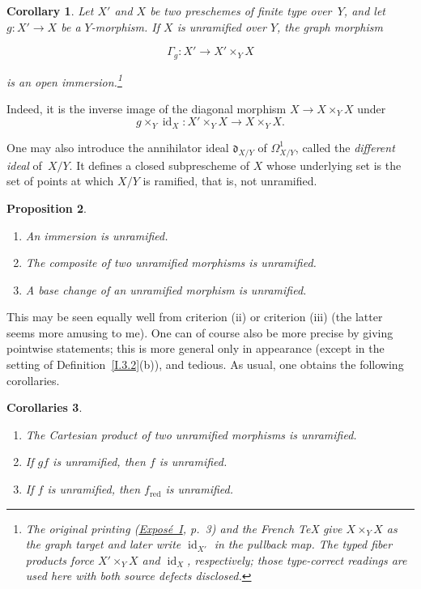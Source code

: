\documentclass[11pt,oneside]{amsbook}
\newtheorem{proposition}{Proposition}[section]
\newtheorem{corollary}[proposition]{Corollary}
\newtheorem{corollaries}[proposition]{Corollaries}
\theoremstyle{remark}
\theoremstyle{plain}
\numberwithin{equation}{section}
\begin{document}
\begin{corollary}
\label{I.3.4}
Let \(X'\) and \(X\) be two preschemes of finite type over~\(Y\), and let
\(g\colon X'\to X\) be a \(Y\)-morphism.  If \(X\) is unramified over
\(Y\), the graph morphism

\[
  \Gamma_g\colon X'\longrightarrow X'\times_Y X
\]

is an open immersion.\footnote{The original printing
(\hyperref[I]{Expos\'e~I}, p.~3) and
the French TeX give \(X\times_Y X\) as the graph target and later write
\(\operatorname{id}_{X'}\) in the pullback map.  The typed fiber products
force \(X'\times_Y X\) and \(\operatorname{id}_X\), respectively; those
type-correct readings are used here with both source defects disclosed.}
\end{corollary}

Indeed, it is the inverse image of the diagonal morphism
\(X\to X\times_Y X\) under
\[
g\times_Y\operatorname{id}_{X}\colon
X'\times_Y X\longrightarrow X\times_Y X.
\]

One may also introduce the annihilator ideal
\(\mathfrak d_{X/Y}\)\label{indnot:af} of \(\Omega^1_{X/Y}\), called the
\emph{different ideal} of~\(X/Y\).  It defines a closed subprescheme of
\(X\) whose underlying set is the set of points at which \(X/Y\) is
ramified, that is, not unramified.

\begin{proposition}
\label{I.3.5}
\begin{enumerate}
\item[(i)] An immersion is unramified.
\item[(ii)] The composite of two unramified morphisms is unramified.
\item[(iii)] A base change of an unramified morphism is unramified.
\end{enumerate}
\end{proposition}

This may be seen equally well from criterion \textup{(ii)} or criterion
\textup{(iii)} (the latter seems more amusing to me).  One can of course
also be more precise by giving pointwise statements; this is more general
only in appearance (except in the setting of Definition~\ref{I.3.2}(b)), and
tedious.  As usual, one obtains the following corollaries.

\begin{corollaries}
\label{I.3.6}
\begin{enumerate}
\item[(iv)] The Cartesian product of two unramified morphisms is unramified.
\item[(v)] If \(gf\) is unramified, then \(f\) is unramified.
\item[(vi)] If \(f\) is unramified, then \(f_{\mathrm{red}}\) is
  unramified.
\end{enumerate}
\end{corollaries}
\end{document}
